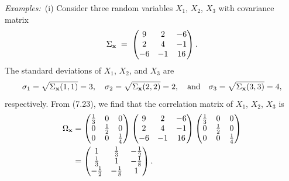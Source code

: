 \par\medskip\noindent\textit{Examples:}\ (i) Consider three random variables $X_1$,
$X_2$, $X_3$ with covariance matrix
\[
\Sigma_{\mathbf{x}} \;=\; \begin{pmatrix} 9 & 2 & -6 \\ 2 & 4 & -1 \\ -6 & -1 & 16 \end{pmatrix}.
\]
The standard deviations of $X_1$, $X_2$, and $X_3$ are
\[
\sigma_1 = \sqrt{\Sigma_{\mathbf{x}}(1,1)} = 3, \quad \sigma_2 = \sqrt{\Sigma_{\mathbf{x}}(2,2)} = 2,
\quad \text{and} \quad \sigma_3 = \sqrt{\Sigma_{\mathbf{x}}(3,3)} = 4,
\]
respectively. From (7.23), we find that the correlation matrix of $X_1$, $X_2$, $X_3$
is
\begin{align*}
\Omega_{\mathbf{x}} &= \begin{pmatrix} \frac13 & 0 & 0 \\ 0 & \frac12 & 0 \\ 0 & 0 & \frac14 \end{pmatrix}
\begin{pmatrix} 9 & 2 & -6 \\ 2 & 4 & -1 \\ -6 & -1 & 16 \end{pmatrix}
\begin{pmatrix} \frac13 & 0 & 0 \\ 0 & \frac12 & 0 \\ 0 & 0 & \frac14 \end{pmatrix} \\
&= \begin{pmatrix} 1 & \frac13 & -\frac12 \\ \frac13 & 1 & -\frac18 \\ -\frac12 & -\frac18 & 1 \end{pmatrix}.
\end{align*}


